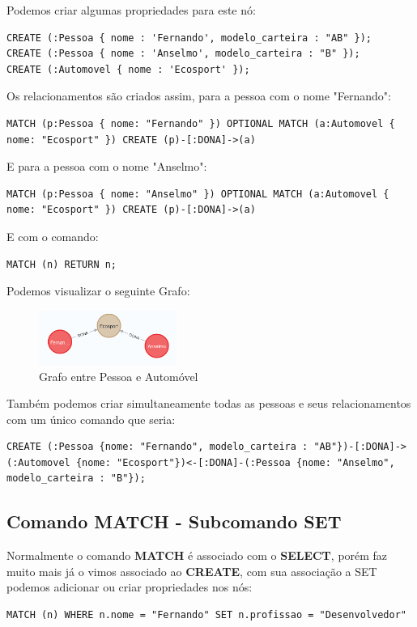 Podemos criar algumas propriedades para este nó:
\begin{lstlisting}[]
CREATE (:Pessoa { nome : 'Fernando', modelo_carteira : "AB" });
CREATE (:Pessoa { nome : 'Anselmo', modelo_carteira : "B" });
CREATE (:Automovel { nome : 'Ecosport' });
\end{lstlisting}

Os relacionamentos são criados assim, para a pessoa com o nome "Fernando":
\begin{lstlisting}[]
MATCH (p:Pessoa { nome: "Fernando" }) OPTIONAL MATCH (a:Automovel { nome: "Ecosport" }) CREATE (p)-[:DONA]->(a)
\end{lstlisting}

E para a pessoa com o nome "Anselmo":
\begin{lstlisting}[]
MATCH (p:Pessoa { nome: "Anselmo" }) OPTIONAL MATCH (a:Automovel { nome: "Ecosport" }) CREATE (p)-[:DONA]->(a)
\end{lstlisting}

E com o comando:
\begin{lstlisting}[]
MATCH (n) RETURN n;
\end{lstlisting}

Podemos visualizar o seguinte Grafo:
\begin{figure}[H]
	\centering
	\includegraphics[width=0.4\textwidth]{imagens/relacionamento}
	\caption{Grafo entre Pessoa e Automóvel}
\end{figure}

Também podemos criar simultaneamente todas as pessoas e seus relacionamentos com um único comando que seria:
\begin{lstlisting}[]
CREATE (:Pessoa {nome: "Fernando", modelo_carteira : "AB"})-[:DONA]->(:Automovel {nome: "Ecosport"})<-[:DONA]-(:Pessoa {nome: "Anselmo", modelo_carteira : "B"});
\end{lstlisting}

\subsection{Comando MATCH - Subcomando SET}
Normalmente o comando \textbf{MATCH} é associado com o \textbf{SELECT}, porém faz muito mais já o vimos associado ao \textbf{CREATE}, com sua associação a SET podemos adicionar ou criar propriedades nos nós:
\begin{lstlisting}[]
MATCH (n) WHERE n.nome = "Fernando" SET n.profissao = "Desenvolvedor"
\end{lstlisting}


